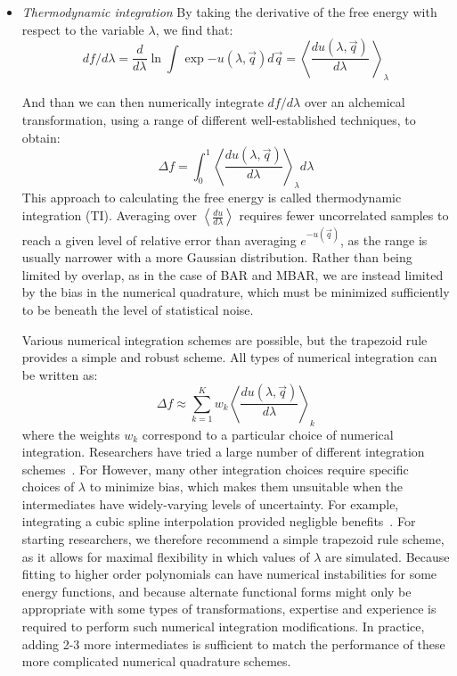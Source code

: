 \documentclass[9pt,bestpractices]{livecoms}
\newcommand{\expect}[1]{\left\langle{#1}\right\rangle}
\begin{document}
\begin{enumerate}
\begin{itemize}
\item \textit{Thermodynamic integration} 
By taking the derivative of the free energy with respect to the
variable $\lambda$, we find that:
\begin{equation}
df/d\lambda = \frac{d}{d\lambda} \ln \int \exp{-u(\lambda,\vec{q})} d\vec{q} = \expect{\frac{du(\lambda,\vec{q})}{d\lambda}\
}_{\lambda} 
\end{equation}

And than we can then numerically integrate $df/d\lambda$ over an alchemical transformation, using a range of different well-established techniques, to obtain:
\begin{equation}
\Delta f    = \int_{0}^{1} \expect{\frac{du(\lambda,\vec{q})}{d\lambda}}_{\lambda}  d\lambda    
\end{equation}
This approach to calculating the free energy is called thermodynamic integration (TI). Averaging over $\expect{\frac{du}{d\lambda}}$ requires
fewer uncorrelated samples to reach a given level of relative error
than averaging $e^{-u(\vec{q})}$, as the range is usually
narrower with a more Gaussian distribution. Rather than being limited by overlap, as in the case of BAR and MBAR, we are instead limited by the bias in the numerical quadrature, which must be minimized sufficiently to be beneath the level of statistical noise.

Various numerical integration schemes are possible, but the trapezoid
rule provides a simple and robust scheme.  All types of
numerical integration can be written as:
\[ \Delta f \approx \sum_{k=1}^{K} w_k
\expect{\frac{du(\lambda,\vec{q})}{d\lambda}}_{k} \] where the weights
$w_k$ correspond to a particular choice of numerical integration.
Researchers have tried a large number of different integration
schemes~\cite{resat.mezei.93,jorge_effect_2010,shyu_reducing_2009}. For However, many other integration choices require specific choices of $\lambda$
to minimize bias, which makes them unsuitable when the intermediates
have widely-varying levels of uncertainty. For example, integrating a cubic spline interpolation provided negligble benefits~\cite{paliwal.benchmark}. For starting researchers, we therefore recommend a simple trapezoid rule scheme, as it allows for maximal flexibility in which values of $\lambda$ are simulated.  Because fitting to higher
order polynomials can have numerical instabilities for some energy functions, and because alternate functional forms might only be appropriate
with some types of transformations, expertise and experience is
required to perform such numerical integration modifications.  In practice, adding 2-3 more intermediates is sufficient to match the performance of these more complicated numerical quadrature schemes.


\end{itemize}
\end{enumerate}
\end{document}
